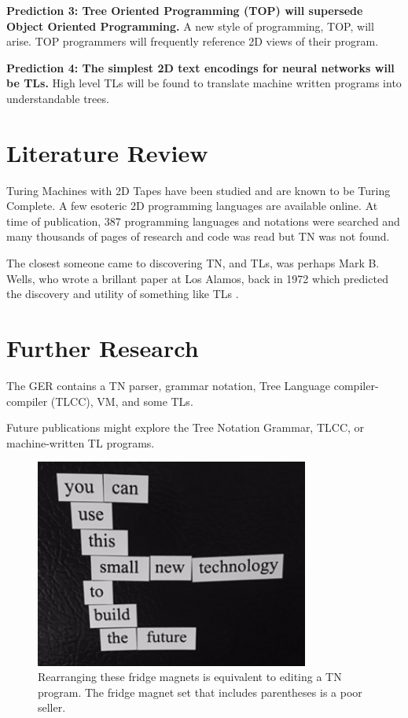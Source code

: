 \documentclass[journal]{IEEEtran}
\begin{document}
\textbf{Prediction 3: Tree Oriented Programming (TOP) will supersede Object Oriented Programming.} A new style of programming, TOP, will arise. TOP programmers will frequently reference 2D views of their program.

\textbf{Prediction 4: The simplest 2D text encodings for neural networks will be TLs.} High level TLs will be found to translate machine written programs into understandable trees.

\section{Literature Review}

Turing Machines with 2D Tapes have been studied and are known to be Turing Complete\cite{Toida}. A few esoteric 2D programming languages are available online\cite{Ender}. At time of publication, 387 programming languages and notations were searched and many thousands of pages of research and code was read but TN was not found.

The closest someone came to discovering TN, and TLs, was perhaps Mark B. Wells, who wrote a brillant paper at Los Alamos, back in 1972 which predicted the discovery and utility of something like TLs \cite{Wells}.

\section{Further Research}

The GER contains a TN parser, grammar notation, Tree Language compiler-compiler (TLCC), VM, and some TLs.

Future publications might explore the Tree Notation Grammar, TLCC, or machine-written TL programs.
\begin{figure}[ht!]
\centering
\includegraphics[width=90mm]{tree.jpg}
\caption{Rearranging these fridge magnets is equivalent to editing a TN program. The fridge magnet set that includes parentheses is a poor seller.}
\end{figure}
\end{document}
